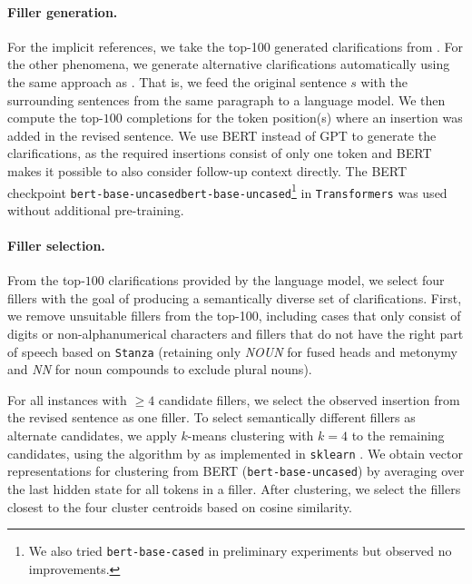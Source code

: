 \documentclass[11pt]{article}
\begin{document}
\paragraph{Filler generation.} For the implicit references, we take the 
top-100 generated clarifications from . For the other phenomena, we 
generate alternative clarifications automatically
using 
the same approach as . That is, we feed the original sentence $s$ with the surrounding sentences from the same 
paragraph to a language model. We then compute the top-$100$ completions for the token position(s) where an insertion was added in the revised sentence.
We use BERT \cite{devlin-etal-2019-bert} instead of GPT \cite{Radford:2018:gpt} to generate the clarifications, as the required insertions consist of only one token and BERT makes it possible to also consider follow-up context directly.
The BERT checkpoint \texttt{bert-base-uncased}\texttt{bert-base-uncased}\footnote{
We also tried \texttt{bert-base-cased} in preliminary experiments but observed no improvements.}
%
in \texttt{Transformers} \cite{wolf-etal-2020-transformers} was used without additional pre-training.

\paragraph{Filler selection.}
From the top-$100$ clarifications provided by the language model, we select four fillers with the goal of producing a semantically diverse set of clarifications.
First, we remove unsuitable fillers from the top-100, including 
cases
that only consist of digits or non-alphanumerical characters and fillers that do not have the right part of speech based on \texttt{Stanza} (retaining only \textit{NOUN} for fused heads and metonymy and \textit{NN} for noun compounds to exclude plural nouns).

For all instances with $\ge 4$ candidate fillers, we select the observed insertion from the revised sentence as one filler. To select semantically different fillers as alternate candidates, we apply $k$-means clustering with $k = 4$ to the remaining candidates, using the algorithm 
by  as implemented in \texttt{sklearn} \cite{scikit-learn}. We obtain vector representations for clustering from BERT (\texttt{bert-base-uncased}) by averaging over the last hidden state for all tokens in a filler. 
After clustering,
we select the fillers closest to the four cluster centroids based on cosine similarity.
\end{document}

